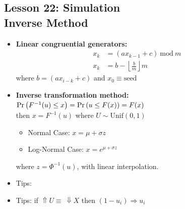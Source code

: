 \documentclass[10pt, french]{article}
\begin{document}
\begin{multicols*}{3}
\section*{Lesson 22: Simulation \\ Inverse Method}
\begin{itemize}[align=left,leftmargin=*]
    \item \textbf{Linear congruential generators:}
    \begin{align*}
        x_k &= (ax_{k-1}+c)\: \mathrm{mod}\: m \\
        x_k &= b - \left\lfloor \frac{b}{m} \right\rfloor m
    \end{align*}
    where $b = (ax_{i-k}+c)$ and $x_0\equiv\mathrm{seed}$
    \item \textbf{Inverse transformation method:}\\ $ \Pr \left( F^{-1}(u)\leq x \right) = \Pr \left( u\leq F(x) \right) = F(x) $ \\ then $x = F^{-1}(u)$ where $U \sim \mathrm{Unif}(0,1)$
    \begin{itemize}
        \item Normal Case: $x = \mu + \sigma z$
        \item Log-Normal Case: $x = e^{\mu + \sigma z}$
    \end{itemize}
    where $z = \Phi^{-1}(u)$, with linear interpolation.
    \item Tips: {\color{AppendixColor}}
    \item Tips: if $\Uparrow U \equiv\: \Downarrow X$ then $(1-u_i)\Rightarrow u_i$ 
\end{itemize}


\end{multicols*}
\end{document}
